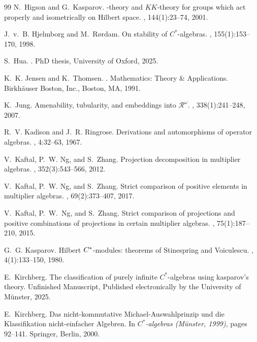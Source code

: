 \documentclass[reqno]{amsart}
\theoremstyle{definition}
\theoremstyle{remark}
\numberwithin{equation}{section}
\theoremstyle{definition}
\begin{document}
\begin{thebibliography}{99}
N.~Higson and G.~Kasparov.
-theory and {$KK$}-theory for groups which act properly and
  isometrically on {H}ilbert space.
, 144(1):23--74, 2001.

J.~v.~B. Hjelmborg and M.~R{\o}rdam.
\newblock On stability of {$C^*$}-algebras.
, 155(1):153--170, 1998.

S.~Hua.
.
\newblock PhD thesis, University of Oxford, 2025.

K.~K. Jensen and K.~Thomsen.
.
\newblock Mathematics: Theory \& Applications. Birkh\"auser Boston, Inc.,
  Boston, MA, 1991.

K.~Jung.
\newblock Amenability, tubularity, and embeddings into {$\mathcal R^\omega$}.
, 338(1):241--248, 2007.

R.~V. Kadison and J.~R. Ringrose.
\newblock Derivations and automorphisms of operator algebras.
, 4:32--63, 1967.

V.~Kaftal, P.~W. Ng, and S.~Zhang.
\newblock Projection decomposition in multiplier algebras.
, 352(3):543--566, 2012.

V.~Kaftal, P.~W. Ng, and S.~Zhang.
\newblock Strict comparison of positive elements in multiplier algebras.
, 69(2):373--407, 2017.

V.~Kaftal, P.~W.~Ng, and S.~Zhang. 
\newblock Strict comparison of projections and positive combinations of projections in certain multiplier algebras. 
, 75(1):187--210, 2015. 



G.~G. Kasparov.
\newblock Hilbert {$C\sp{\ast} $}-modules: theorems of {S}tinespring and
  {V}oiculescu.
, 4(1):133--150, 1980.

E.~Kirchberg.
\newblock The classification of purely infinite ${C^*}$-algebras using kasparov’s
  theory.
\newblock Unfinished Manuscript, Published electronically by the University of
  Münster, 2025.

E.~Kirchberg.
\newblock Das nicht-kommutative {M}ichael-{A}uswahlprinzip und die
  {K}lassifikation nicht-einfacher {A}lgebren.
\newblock In {\em {$C^*$}-algebras ({M}\"{u}nster, 1999)}, pages 92--141.
  Springer, Berlin, 2000.


\end{thebibliography}
\end{document}
